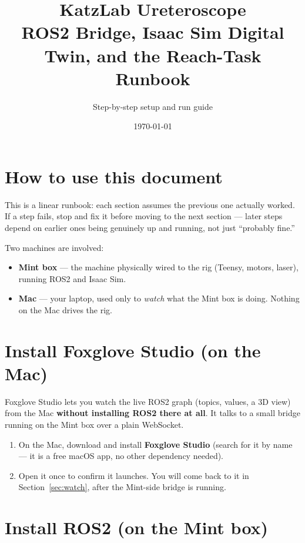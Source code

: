 \documentclass[11pt]{article}
\title{\textbf{\color{katzblue} KatzLab Ureteroscope}\\[4pt]
ROS2 Bridge, Isaac Sim Digital Twin, and the Reach-Task Runbook}
\author{Step-by-step setup and run guide}
\date{\today}
\begin{document}
\maketitle
\thispagestyle{fancy}

\section*{How to use this document}
This is a linear runbook: each section assumes the previous one actually
worked. If a step fails, stop and fix it before moving to the next section
--- later steps depend on earlier ones being genuinely up and running, not
just ``probably fine.''

Two machines are involved:
\begin{itemize}
  \item \textbf{Mint box} --- the machine physically wired to the rig
        (Teensy, motors, laser), running ROS2 and Isaac Sim.
  \item \textbf{Mac} --- your laptop, used only to \emph{watch} what the
        Mint box is doing. Nothing on the Mac drives the rig.
\end{itemize}

\tableofcontents
\newpage

\section{Install Foxglove Studio (on the Mac)}

Foxglove Studio lets you watch the live ROS2 graph (topics, values, a 3D
view) from the Mac \textbf{without installing ROS2 there at all}. It talks
to a small bridge running on the Mint box over a plain WebSocket.

\begin{enumerate}
  \item On the Mac, download and install \textbf{Foxglove Studio} (search
        for it by name --- it is a free macOS app, no other dependency
        needed).
  \item Open it once to confirm it launches. You will come back to it in
        Section~\ref{sec:watch}, after the Mint-side bridge is running.
\end{enumerate}

\section{Install ROS2 (on the Mint box)}
\end{document}
